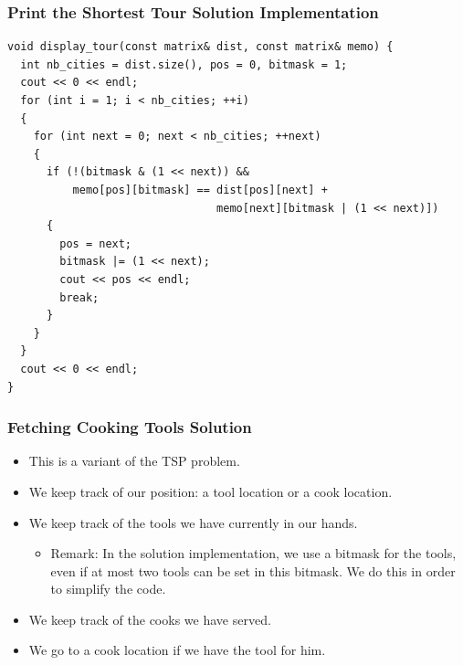 \documentclass{beamer}
\newcommand{\cheflink}[2]{Code Chef (http://www.codechef.com)
  problem \href{#2}{\textcolor{blue}{#1}.}}
\newcounter{exo}
\newcommand{\exo}{
  \addtocounter{exo}{1}
  Exercice \arabic{exo}
}
\begin{document}
\ifanswers

\begin{frame}[containsverbatim]
\frametitle{Print the Shortest Tour Solution Implementation}

\scriptsize
\begin{lstlisting}
void display_tour(const matrix& dist, const matrix& memo) {
  int nb_cities = dist.size(), pos = 0, bitmask = 1;
  cout << 0 << endl;
  for (int i = 1; i < nb_cities; ++i)
  {
    for (int next = 0; next < nb_cities; ++next)
    {
      if (!(bitmask & (1 << next)) &&
          memo[pos][bitmask] == dist[pos][next] +
                                memo[next][bitmask | (1 << next)])
      {
        pos = next;
        bitmask |= (1 << next);
        cout << pos << endl;
        break;
      }
    }
  }
  cout << 0 << endl;
}
\end{lstlisting}

\end{frame}

\fi


\ifanswers

\begin{frame}%
\frametitle{Fetching Cooking Tools Solution}

\begin{itemize}

\item This is a variant of the TSP problem.

\vspace{0.4cm}

\item We keep track of our position: a tool location or a cook location.

\vspace{0.4cm}

\item<2-> We keep track of the tools we have currently in our hands.
\begin{itemize}
\item<2-> Remark: In the solution implementation, we use a bitmask for the tools, even if at most two tools
can be set in this bitmask. We do this in order to simplify the code.
\end{itemize}

\vspace{0.4cm}

\item<3-> We keep track of the cooks we have served.

\vspace{0.4cm}

\item<4-> We go to a cook location if we have the tool for him.

\end{itemize}

\end{frame}
\end{document}

